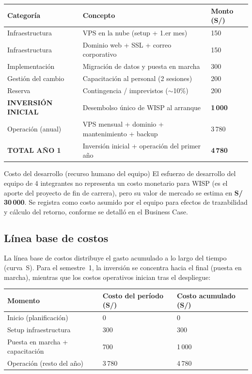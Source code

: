 \begin{center}
\label{tab:presupuesto}
\begin{tabularx}{\textwidth}{L{3.2cm} X R{2.2cm}}
\toprule
\textbf{Categoría} & \textbf{Concepto} & \textbf{Monto (S/)} \\
\midrule
Infraestructura & VPS en la nube (setup + 1.er mes) & 150 \\
Infraestructura & Dominio web + SSL + correo corporativo & 150 \\
Implementación & Migración de datos y puesta en marcha & 300 \\
Gestión del cambio & Capacitación al personal (2 sesiones) & 200 \\
Reserva & Contingencia / imprevistos ($\sim$10\%) & 200 \\
\midrule
\textbf{INVERSIÓN INICIAL} & Desembolso único de WISP al arranque & \textbf{1\,000} \\
Operación (anual) & VPS mensual + dominio + mantenimiento + backup & 3\,780 \\
\textbf{TOTAL AÑO 1} & Inversión inicial + operación del primer año & \textbf{4\,780} \\
\bottomrule
\end{tabularx}
\end{center}

\begin{upeubox}{Costo del desarrollo (recurso humano del equipo)}
El esfuerzo de desarrollo del equipo de 4 integrantes no representa un costo monetario
para WISP (es el aporte del proyecto de fin de carrera), pero su valor de mercado se
estima en \textbf{S/ 30\,000}. Se registra como costo asumido por el equipo para
efectos de trazabilidad y cálculo del retorno, conforme se detalló en el Business Case.
\end{upeubox}

\subsection{Línea base de costos}

La línea base de costos distribuye el gasto acumulado a lo largo del tiempo (curva~S).
Para el semestre~1, la inversión se concentra hacia el final (puesta en marcha),
mientras que los costos operativos inician tras el despliegue:

\begin{center}
\label{tab:linea-base}
\begin{tabularx}{\textwidth}{X R{3.2cm} R{3.2cm}}
\toprule
\textbf{Momento} & \textbf{Costo del período (S/)} & \textbf{Costo acumulado (S/)} \\
\midrule
Inicio (planificación) & 0 & 0 \\
Setup infraestructura & 300 & 300 \\
Puesta en marcha + capacitación & 700 & 1\,000 \\
Operación (resto del año) & 3\,780 & 4\,780 \\
\bottomrule
\end{tabularx}
\end{center}

